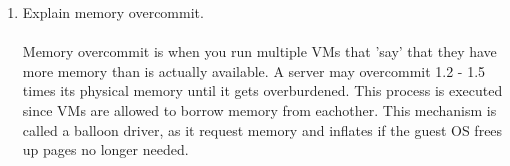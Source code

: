 \documentclass[12pt]{article}
\begin{document}
\begin{enumerate}
	\item Explain memory overcommit. \\ \\
	Memory overcommit is when you run multiple VMs that 'say' that they have more memory than is actually available. A server may overcommit 1.2 - 1.5 times its physical memory until it gets overburdened. This process is executed since VMs are allowed to borrow memory from eachother. This mechanism is called a balloon driver, as it request memory and inflates if the guest OS frees up pages no longer needed.
	
      
\end{enumerate}
\end{document}
